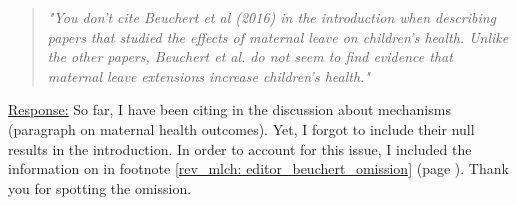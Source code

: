 % 
\bigskip
\begin{quote}
	\textit{"You don’t cite Beuchert et al (2016) in the introduction when describing papers that studied the effects of maternal leave on children’s health. Unlike the other papers, Beuchert et al. do not seem to find evidence that maternal leave extensions increase children’s health."}
\end{quote}
\underline{Response:} So far, I have been citing \cite{beuchert2016} in the discussion about mechanisms (paragraph on maternal health outcomes). Yet, I forgot to include their null results in the introduction. In order to account for this issue, I included the information on \cite{beuchert2016} in footnote \ref{rev_mlch: editor_beuchert_omission} (page \pageref{rev_mlch: editor_beuchert_omission}). Thank you for spotting the omission.
